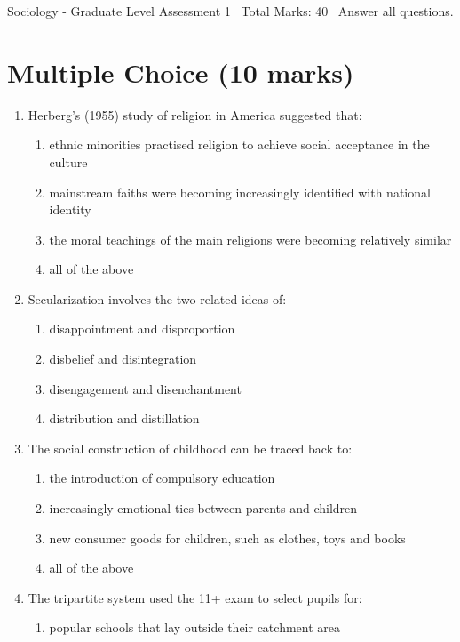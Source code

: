 \documentclass[12pt]{article}
\begin{document}
\begin{center}
Sociology - Graduate Level Assessment 1 \
Total Marks: 40 \
Answer all questions.
\end{center}

\section*{Multiple Choice (10 marks)}
\begin{enumerate}[label=\arabic*.]
\item Herberg's (1955) study of religion in America suggested that:
\begin{enumerate}[label=(\alph*)]
    \item ethnic minorities practised religion to achieve social acceptance in the culture
    \item mainstream faiths were becoming increasingly identified with national identity
    \item the moral teachings of the main religions were becoming relatively similar
    \item all of the above
\end{enumerate}
\item Secularization involves the two related ideas of:
\begin{enumerate}[label=(\alph*)]
    \item disappointment and disproportion
    \item disbelief and disintegration
    \item disengagement and disenchantment
    \item distribution and distillation
\end{enumerate}
\item The social construction of childhood can be traced back to:
\begin{enumerate}[label=(\alph*)]
    \item the introduction of compulsory education
    \item increasingly emotional ties between parents and children
    \item new consumer goods for children, such as clothes, toys and books
    \item all of the above
\end{enumerate}
\item The tripartite system used the 11+ exam to select pupils for:
\begin{enumerate}[label=(\alph*)]
    \item popular schools that lay outside their catchment area

\end{enumerate}
\end{enumerate}
\end{document}
